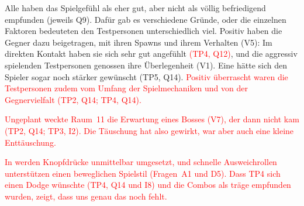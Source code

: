 \documentclass[../Main.tex]{subfiles}
\begin{document}
Alle haben das Spielgefühl als eher gut, aber nicht als völlig befriedigend empfunden (jeweils Q9). Dafür gab es verschiedene Gründe, oder die einzelnen Faktoren bedeuteten den Testpersonen unterschiedlich viel. Positiv haben die Gegner dazu beigetragen, mit ihren Spawns und ihrem Verhalten (V5): Im direkten Kontakt haben sie sich sehr gut angefühlt \textcolor{red}{(TP4, Q12)}, und die aggressiv spielenden Testpersonen genossen ihre Überlegenheit (V1). Eine hätte sich den Spieler sogar noch stärker gewünscht (TP5, Q14). \textcolor{red}{Positiv überrascht waren die Testpersonen zudem vom Umfang der Spielmechaniken und von der Gegnervielfalt (TP2, Q14; TP4, Q14).}

\textcolor{red}{Ungeplant weckte Raum~11 die Erwartung eines Bosses (V7), der dann nicht kam (TP2, Q14; TP3, I2). Die Täuschung hat also gewirkt, war aber auch eine kleine Enttäuschung.}

\textcolor{red}{In  werden Knopfdrücke unmittelbar umgesetzt, und schnelle Ausweichrollen unterstützen einen beweglichen Spielstil (Fragen~A1 und D5). Dass TP4 sich einen Dodge wünschte (TP4, Q14 und I8) und die Combos als träge empfunden wurden, zeigt, dass uns genau das noch fehlt.}
\end{document}
